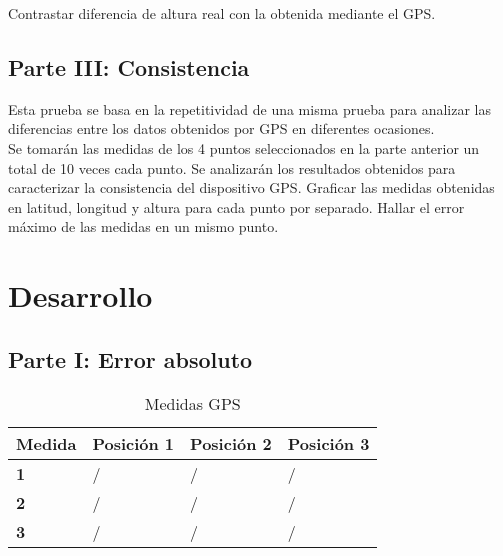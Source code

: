 \documentclass[spanish,12pt,a4paper,titlepage]{report}
\begin{document}
Contrastar diferencia de altura real con la obtenida mediante el GPS.

\subsection{Parte III: Consistencia}

Esta prueba se basa en la repetitividad de una misma prueba para analizar las diferencias entre los datos obtenidos por GPS en diferentes ocasiones.\\

Se tomarán las medidas de los 4 puntos seleccionados en la parte anterior un total de 10 veces cada punto. Se analizarán los resultados obtenidos para caracterizar la consistencia del dispositivo GPS. Graficar las medidas obtenidas en latitud, longitud y altura para cada punto por separado. Hallar el error máximo de las medidas en un mismo punto.

\section{Desarrollo}
\subsection{Parte I: Error absoluto}

\begin{table}[H]
\begin{center}
\begin{tabular}{|p{40pt}|p{110pt}|p{110pt}|p{110pt}|} 
\hline
  \cellcolor[gray]{0.8} \textbf{Medida} 
& \cellcolor[gray]{0.8} \textbf{Posición 1} 
& \cellcolor[gray]{0.8} \textbf{Posición 2} 
& \cellcolor[gray]{0.8} \textbf{Posición 3} \\ \hline \hline
\multicolumn{1}{|p{40pt}|}{\cellcolor[gray]{0.8}\textbf{1}} & \hspace{50pt}/ & \hspace{50pt}/ & \hspace{50pt}/ \\ \hline 
\multicolumn{1}{|p{40pt}|}{\cellcolor[gray]{0.8}\textbf{2}} & \hspace{50pt}/& \hspace{50pt}/& \hspace{50pt}/ \\ \hline 
\multicolumn{1}{|p{40pt}|}{\cellcolor[gray]{0.8}\textbf{3}} & \hspace{50pt}/& \hspace{50pt}/& \hspace{50pt}/ \\ \hline 
\end{tabular} 
\caption{Medidas GPS}
\label{tab:I-medidas}
\end{center}
\end{table}
\end{document}
